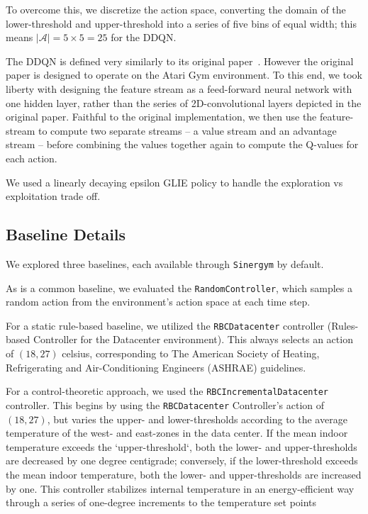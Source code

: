 \documentclass[12pt]{article}
\begin{document}
To overcome this, we discretize the action space, converting the domain of the lower-threshold and upper-threshold into a series of five bins of equal width; this means $|\mathcal A| = 5 \times 5 = 25$ for the DDQN. 

The DDQN is defined very similarly to its original paper~\cite{wang2016dueling}. However the original paper is designed to operate on the Atari Gym environment. To this end, we took liberty with designing the feature stream as a feed-forward neural network with one hidden layer, rather than the series of 2D-convolutional layers depicted in the original paper. Faithful to the original implementation, we then use the feature-stream to compute two separate streams -- a value stream and an advantage stream -- before combining the values together again to compute the Q-values for each action. 

We used a linearly decaying epsilon GLIE policy to handle the exploration vs exploitation trade off. 

\subsection{Baseline Details}\label{method:baseline}

We explored three baselines, each available through \texttt{Sinergym} by default. 

As is a common baseline, we evaluated the \texttt{RandomController}, which samples a random action from the environment's action space at each time step. 

For a static rule-based baseline, we utilized the \texttt{RBCDatacenter} controller (Rules-based Controller for the Datacenter environment). This always selects an action of $(18, 27)$ celsius, corresponding to The American Society of Heating, Refrigerating and Air-Conditioning Engineers (ASHRAE) guidelines. 

For a control-theoretic approach, we used the \texttt{RBCIncrementalDatacenter} controller. This begins by using the \texttt{RBCDatacenter} Controller's action of $(18, 27)$, but varies the upper- and lower-thresholds according to the average temperature of the west- and east-zones in the data center. If the mean indoor temperature exceeds the `upper-threshold`, both the lower- and upper-thresholds are decreased by one degree centigrade; conversely, if the lower-threshold exceeds the mean indoor temperature, both the lower- and upper-thresholds are increased by one. This controller stabilizes internal temperature in an energy-efficient way through a series of one-degree increments to the temperature set points 
\end{document}
